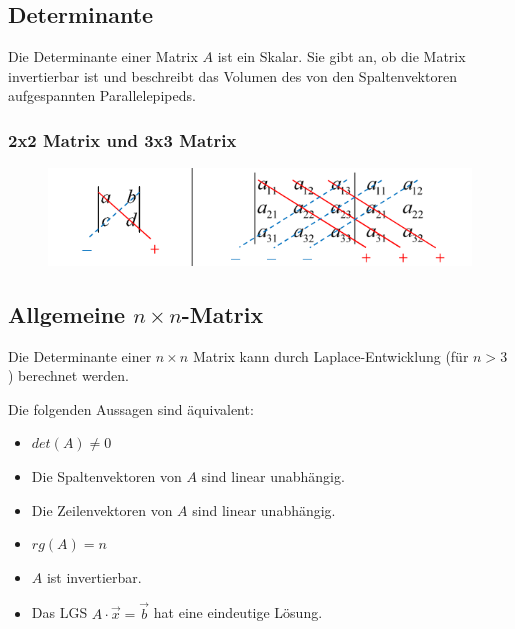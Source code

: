 \documentclass{article}
\begin{document}
\hfill
\begin{minipage}[t]{0.45\textwidth}
    \subsection*{Determinante}
    Die Determinante einer Matrix \( A \) ist ein Skalar. Sie gibt an, ob die Matrix invertierbar ist und beschreibt das Volumen des von den Spaltenvektoren aufgespannten Parallelepipeds.
    \subsubsection*{2x2 Matrix und 3x3 Matrix}
     \begin{figure}[H]
        \includegraphics[scale=0.4]{images/determinante.png}
     \end{figure}

    \subsection*{Allgemeine $n \times n$-Matrix}
    Die Determinante einer \( n \times n \) Matrix kann durch Laplace-Entwicklung (für \( n > 3 \)) berechnet werden.
    
    
    Die folgenden Aussagen sind äquivalent:
    \begin{itemize}
        \item $det(A) \neq 0$ 
        \item Die Spaltenvektoren von $A$ sind linear unabhängig.
        \item Die Zeilenvektoren von $A$ sind linear unabhängig.
        \item $rg(A) = n$
        \item $A$ ist invertierbar.
        \item Das LGS $A \cdot \vec{x} = \vec{b}$ hat eine eindeutige Lösung.
    \end{itemize}
\end{minipage}
\end{document}
